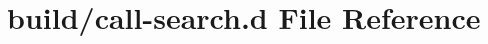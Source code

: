 \hypertarget{call-search_8d}{}\section{build/call-\/search.d File Reference}
\label{call-search_8d}
